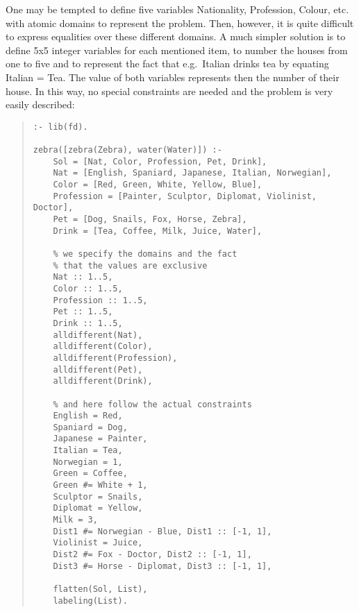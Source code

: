 One may be tempted to define five variables Nationality,
Profession, Colour, etc. with atomic domains to represent
the problem.
Then, however, it is quite difficult to express equalities
over these different domains.
A much simpler solution is to define 5x5 integer variables for each
mentioned item, to number the houses from one to five
and to represent the fact that e.g.\ Italian drinks tea
by equating Italian = Tea.
The value of both variables represents then the number of their house.
In this way, no special constraints are needed and
the problem is very easily described:
\begin{quote}
\begin{verbatim}
:- lib(fd).

zebra([zebra(Zebra), water(Water)]) :-
    Sol = [Nat, Color, Profession, Pet, Drink],
    Nat = [English, Spaniard, Japanese, Italian, Norwegian],
    Color = [Red, Green, White, Yellow, Blue],
    Profession = [Painter, Sculptor, Diplomat, Violinist, Doctor],
    Pet = [Dog, Snails, Fox, Horse, Zebra],
    Drink = [Tea, Coffee, Milk, Juice, Water],

    % we specify the domains and the fact
    % that the values are exclusive
    Nat :: 1..5,
    Color :: 1..5,
    Profession :: 1..5,
    Pet :: 1..5,
    Drink :: 1..5,
    alldifferent(Nat),
    alldifferent(Color),
    alldifferent(Profession),
    alldifferent(Pet),
    alldifferent(Drink),

    % and here follow the actual constraints
    English = Red,
    Spaniard = Dog,
    Japanese = Painter,
    Italian = Tea,
    Norwegian = 1,
    Green = Coffee,
    Green #= White + 1,
    Sculptor = Snails,
    Diplomat = Yellow,
    Milk = 3,
    Dist1 #= Norwegian - Blue, Dist1 :: [-1, 1],
    Violinist = Juice,
    Dist2 #= Fox - Doctor, Dist2 :: [-1, 1],
    Dist3 #= Horse - Diplomat, Dist3 :: [-1, 1],

    flatten(Sol, List),
    labeling(List).
\end{verbatim}
\end{quote}

